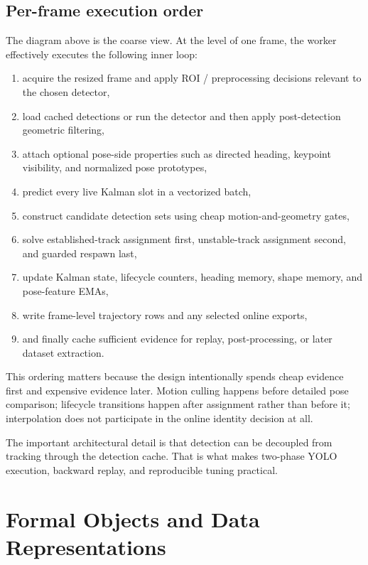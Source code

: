 \documentclass[11pt]{article}
\begin{document}
\subsection{Per-frame execution order}

The diagram above is the coarse view. At the level of one frame, the worker effectively executes the following inner loop:

\begin{enumerate}
  \item acquire the resized frame and apply ROI / preprocessing decisions relevant to the chosen detector,
  \item load cached detections or run the detector and then apply post-detection geometric filtering,
  \item attach optional pose-side properties such as directed heading, keypoint visibility, and normalized pose prototypes,
  \item predict every live Kalman slot in a vectorized batch,
  \item construct candidate detection sets using cheap motion-and-geometry gates,
  \item solve established-track assignment first, unstable-track assignment second, and guarded respawn last,
  \item update Kalman state, lifecycle counters, heading memory, shape memory, and pose-feature EMAs,
  \item write frame-level trajectory rows and any selected online exports,
  \item and finally cache sufficient evidence for replay, post-processing, or later dataset extraction.
\end{enumerate}

This ordering matters because the design intentionally spends cheap evidence first and expensive evidence later. Motion culling happens before detailed pose comparison; lifecycle transitions happen after assignment rather than before it; interpolation does not participate in the online identity decision at all.

The important architectural detail is that detection can be decoupled from tracking through the detection cache. That is what makes two-phase YOLO execution, backward replay, and reproducible tuning practical.

\section{Formal Objects and Data Representations}
\end{document}

